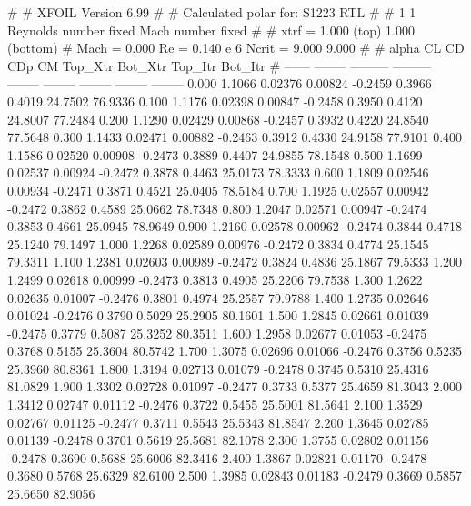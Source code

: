 #  
#       XFOIL         Version 6.99
#  
# Calculated polar for: S1223 RTL                                       
#  
# 1 1 Reynolds number fixed          Mach number fixed         
#  
# xtrf =   1.000 (top)        1.000 (bottom)  
# Mach =   0.000     Re =     0.140 e 6     Ncrit =   9.000  9.000
#  
#   alpha    CL        CD       CDp       CM     Top_Xtr  Bot_Xtr  Top_Itr  Bot_Itr
#  ------ -------- --------- --------- -------- -------- -------- -------- --------
   0.000   1.1066   0.02376   0.00824  -0.2459   0.3966   0.4019  24.7502  76.9336
   0.100   1.1176   0.02398   0.00847  -0.2458   0.3950   0.4120  24.8007  77.2484
   0.200   1.1290   0.02429   0.00868  -0.2457   0.3932   0.4220  24.8540  77.5648
   0.300   1.1433   0.02471   0.00882  -0.2463   0.3912   0.4330  24.9158  77.9101
   0.400   1.1586   0.02520   0.00908  -0.2473   0.3889   0.4407  24.9855  78.1548
   0.500   1.1699   0.02537   0.00924  -0.2472   0.3878   0.4463  25.0173  78.3333
   0.600   1.1809   0.02546   0.00934  -0.2471   0.3871   0.4521  25.0405  78.5184
   0.700   1.1925   0.02557   0.00942  -0.2472   0.3862   0.4589  25.0662  78.7348
   0.800   1.2047   0.02571   0.00947  -0.2474   0.3853   0.4661  25.0945  78.9649
   0.900   1.2160   0.02578   0.00962  -0.2474   0.3844   0.4718  25.1240  79.1497
   1.000   1.2268   0.02589   0.00976  -0.2472   0.3834   0.4774  25.1545  79.3311
   1.100   1.2381   0.02603   0.00989  -0.2472   0.3824   0.4836  25.1867  79.5333
   1.200   1.2499   0.02618   0.00999  -0.2473   0.3813   0.4905  25.2206  79.7538
   1.300   1.2622   0.02635   0.01007  -0.2476   0.3801   0.4974  25.2557  79.9788
   1.400   1.2735   0.02646   0.01024  -0.2476   0.3790   0.5029  25.2905  80.1601
   1.500   1.2845   0.02661   0.01039  -0.2475   0.3779   0.5087  25.3252  80.3511
   1.600   1.2958   0.02677   0.01053  -0.2475   0.3768   0.5155  25.3604  80.5742
   1.700   1.3075   0.02696   0.01066  -0.2476   0.3756   0.5235  25.3960  80.8361
   1.800   1.3194   0.02713   0.01079  -0.2478   0.3745   0.5310  25.4316  81.0829
   1.900   1.3302   0.02728   0.01097  -0.2477   0.3733   0.5377  25.4659  81.3043
   2.000   1.3412   0.02747   0.01112  -0.2476   0.3722   0.5455  25.5001  81.5641
   2.100   1.3529   0.02767   0.01125  -0.2477   0.3711   0.5543  25.5343  81.8547
   2.200   1.3645   0.02785   0.01139  -0.2478   0.3701   0.5619  25.5681  82.1078
   2.300   1.3755   0.02802   0.01156  -0.2478   0.3690   0.5688  25.6006  82.3416
   2.400   1.3867   0.02821   0.01170  -0.2478   0.3680   0.5768  25.6329  82.6100
   2.500   1.3985   0.02843   0.01183  -0.2479   0.3669   0.5857  25.6650  82.9056
